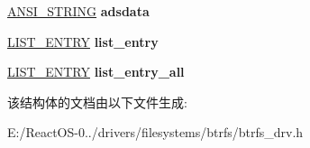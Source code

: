 \begin{DoxyCompactItemize}
\mbox{\label{struct__fcb_a66211c1eed36ac6c93cc32164bf374e4}} 
\hyperlink{struct___a_n_s_i___s_t_r_i_n_g}{A\+N\+S\+I\+\_\+\+S\+T\+R\+I\+NG} {\bfseries adsdata}
\item 
\mbox{\label{struct__fcb_ab24fc1408024b55e2a481fbe1d6b7a1d}} 
\hyperlink{struct___l_i_s_t___e_n_t_r_y}{L\+I\+S\+T\+\_\+\+E\+N\+T\+RY} {\bfseries list\+\_\+entry}
\item 
\mbox{\label{struct__fcb_a15f1edc5d2296fba2bba4a0863e789e7}} 
\hyperlink{struct___l_i_s_t___e_n_t_r_y}{L\+I\+S\+T\+\_\+\+E\+N\+T\+RY} {\bfseries list\+\_\+entry\+\_\+all}
\end{DoxyCompactItemize}


该结构体的文档由以下文件生成\+:\begin{DoxyCompactItemize}
\item 
E\+:/\+React\+O\+S-\/0../drivers/filesystems/btrfs/btrfs\+\_\+drv.\+h\end{DoxyCompactItemize}

